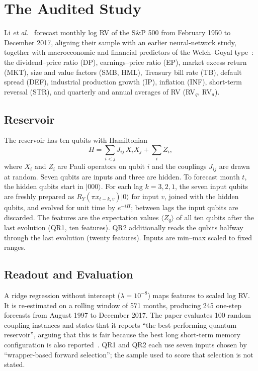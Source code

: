 \documentclass{ieeeaccess}
\begin{document}
\section{The Audited Study}
\label{sec:study}
Li \emph{et al.}~\cite{li2026} forecast monthly log RV of the S\&P 500 from February 1950 to December 2017, aligning their sample with an earlier neural-network study, together with macroeconomic and financial predictors of the Welch--Goyal type~\cite{welch2008}: the dividend--price ratio (DP), earnings--price ratio (EP), market excess return (MKT), size and value factors (SMB, HML), Treasury bill rate (TB), default spread (DEF), industrial production growth (IP), inflation (INF), short-term reversal (STR), and quarterly and annual averages of RV (RV$_q$, RV$_a$).

\subsection{Reservoir}
The reservoir has ten qubits with Hamiltonian
\begin{equation}
H=\sum_{i<j} J_{ij}\,X_iX_j+\sum_{i} Z_i,
\label{eq:ham}
\end{equation}
where $X_i$ and $Z_i$ are Pauli operators on qubit $i$ and the couplings $J_{ij}$ are drawn at random. Seven qubits are inputs and three are hidden. To forecast month $t$, the hidden qubits start in $|000\rangle$. For each lag $k=3,2,1$, the seven input qubits are freshly prepared as $R_Y(\pi x_{t-k,v})|0\rangle$ for input $v$, joined with the hidden qubits, and evolved for unit time by $e^{-iH}$; between lags the input qubits are discarded. The features are the expectation values $\langle Z_q\rangle$ of all ten qubits after the last evolution (QR1, ten features). QR2 additionally reads the qubits halfway through the last evolution (twenty features). Inputs are min--max scaled to fixed ranges.

\subsection{Readout and Evaluation}
A ridge regression without intercept ($\lambda=10^{-8}$) maps features to scaled log RV. It is re-estimated on a rolling window of 571 months, producing 245 one-step forecasts from August 1997 to December 2017. The paper evaluates 100 random coupling instances and states that it reports ``the best-performing quantum reservoir'', arguing that this is fair because the best long short-term memory configuration is also reported~\cite{li2026}. QR1 and QR2 each use seven inputs chosen by ``wrapper-based forward selection''; the sample used to score that selection is not stated.
\end{document}
